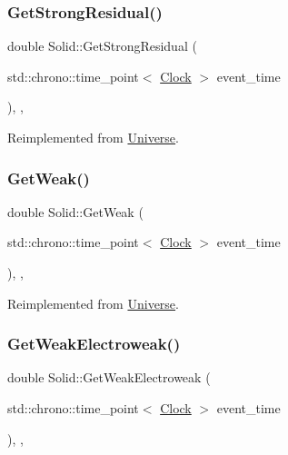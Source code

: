 \subsubsection{\texorpdfstring{Get\+Strong\+Residual()}{GetStrongResidual()}}
{\footnotesize\ttfamily double Solid\+::\+Get\+Strong\+Residual (\begin{DoxyParamCaption}\item[{std\+::chrono\+::time\+\_\+point$<$ \mbox{\hyperlink{universe_8h_a0ef8d951d1ca5ab3cfaf7ab4c7a6fd80}{Clock}} $>$}]{event\+\_\+time }\end{DoxyParamCaption})\hspace{0.3cm}{\ttfamily [inline]}, {\ttfamily [final]}, {\ttfamily [virtual]}}



Reimplemented from \mbox{\hyperlink{classUniverse_af0f4b81950061e63c2855eb40957a5b1}{Universe}}.

\mbox{\label{classSolid_ac8a7738735a6bda4e89414a2b0c370e1}} 
\subsubsection{\texorpdfstring{Get\+Weak()}{GetWeak()}}
{\footnotesize\ttfamily double Solid\+::\+Get\+Weak (\begin{DoxyParamCaption}\item[{std\+::chrono\+::time\+\_\+point$<$ \mbox{\hyperlink{universe_8h_a0ef8d951d1ca5ab3cfaf7ab4c7a6fd80}{Clock}} $>$}]{event\+\_\+time }\end{DoxyParamCaption})\hspace{0.3cm}{\ttfamily [inline]}, {\ttfamily [final]}, {\ttfamily [virtual]}}



Reimplemented from \mbox{\hyperlink{classUniverse_a4476b7e0a3fc1764909f556257fd9ec7}{Universe}}.

\mbox{\label{classSolid_ac98f9c827d58a631627423e25dd611ba}} 
\subsubsection{\texorpdfstring{Get\+Weak\+Electroweak()}{GetWeakElectroweak()}}
{\footnotesize\ttfamily double Solid\+::\+Get\+Weak\+Electroweak (\begin{DoxyParamCaption}\item[{std\+::chrono\+::time\+\_\+point$<$ \mbox{\hyperlink{universe_8h_a0ef8d951d1ca5ab3cfaf7ab4c7a6fd80}{Clock}} $>$}]{event\+\_\+time }\end{DoxyParamCaption})\hspace{0.3cm}{\ttfamily [inline]}, {\ttfamily [final]}, {\ttfamily [virtual]}}



